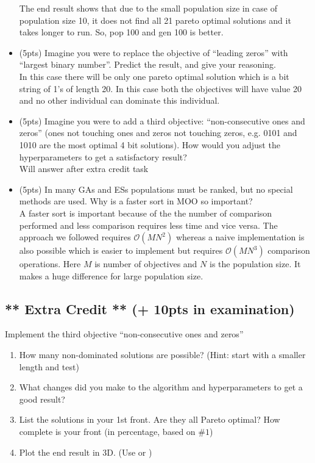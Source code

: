 \documentclass{article}
\begin{document}
\begin{itemize}
	
	{\color{blue}The end result shows that due to the small population size in case of population size 10, it does not find all 21 pareto optimal solutions and it takes longer to run. So, pop 100 and gen 100 is better.}
	
	\item (5pts) Imagine you were to replace the objective of ``leading zeros'' with ``largest binary number''. Predict the result, and give your reasoning.\\
	{\color{blue}In this case there will be only one pareto optimal solution which is a bit string of 1's of length 20. In this case both the objectives will have value 20 and no other individual can dominate this individual.}
	\item (5pts) Imagine you were to add a third objective: ``non-consecutive ones and zeros'' (ones not touching ones and zeros not touching zeros, e.g. 0101 and 1010 are the most optimal 4 bit solutions). How would you adjust the hyperparameters to get a satisfactory result?\\
	{\color{red}Will answer after extra credit task}
	\item (5pts) In many GAs and ESs populations must be ranked, but no special methods are used. Why is a faster sort in MOO so important?\\
	{\color{blue}A faster sort is important because of the the number of comparison performed and less comparison requires less time and vice versa. The approach we followed requires $\mathcal{O}(M N^2)$ whereas a naive implementation is also possible which is easier to implement but requires $\mathcal{O}(M N^3)$ comparison operations. Here $M$ is number of objectives and $N$ is the population size. It makes a huge difference for large population size.}
\end{itemize}

\newpage
\subsection{** Extra Credit ** (+ 10pts in examination)}
Implement the third objective ``non-consecutive ones and zeros''
\begin{enumerate}
	\item How many non-dominated solutions are possible? (Hint: start with a smaller length and test)
	\item What changes did you make to the algorithm and hyperparameters to get a good result?
	\item List the solutions in your 1st front. Are they all Pareto optimal? How complete is your front (in percentage, based on $\#1$)
	\item Plot the end result in 3D. (Use  or )
\end{enumerate}
\end{document}
